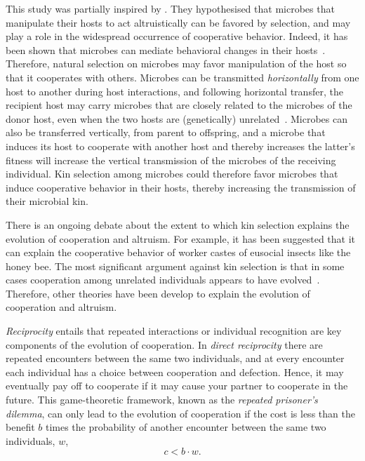 \documentclass[12pt]{extarticle}
\begin{document}
This study was partially inspired by \citet{lewin2017microbes}. 
They hypothesised that microbes that manipulate their hosts to act altruistically can be favored by selection, and may play a role in the widespread occurrence of cooperative behavior. Indeed, it has been shown that microbes can mediate behavioral changes in their hosts~\citep{dobson1988population,poulin2010parasite}. Therefore, natural selection on microbes may favor manipulation of the host so that it cooperates with others. Microbes can be transmitted \emph{horizontally} from one host to another during host interactions, and following horizontal transfer, the recipient host may carry microbes that are closely related to the microbes of the donor host, even when the two hosts are (genetically) unrelated~\citep{lewin2017microbes}. Microbes can also be transferred vertically, from parent to offspring, and %
a microbe that induces its host to cooperate with another host and thereby increases the latter's fitness will  increase the vertical transmission of the microbes of the receiving individual. Kin selection among microbes could therefore favor microbes that induce cooperative behavior in their hosts, thereby increasing the transmission of their microbial kin.




There is an ongoing debate about the extent to which kin selection explains the evolution of cooperation and altruism.
For example, it has been suggested that it can explain the cooperative behavior of worker castes of eusocial insects like the honey bee. %
The most significant argument against kin selection is that in some cases cooperation among unrelated individuals appears to have evolved~\citep{wilson2005kin}.
Therefore, other theories have been develop to explain the evolution of cooperation and altruism.

\emph{Reciprocity} entails that repeated interactions or individual recognition are key components of the evolution of cooperation. In \emph{direct reciprocity} there are repeated encounters between the same two individuals, and at every encounter each individual has a choice between cooperation and defection. Hence, it may eventually pay off to cooperate if it may cause your partner to cooperate in the future.
This game-theoretic framework, known as the \emph{repeated prisoner's dilemma}, 
can only lead to the evolution of cooperation if the cost is less than the benefit $b$ times the probability of another encounter between the same two individuals, $w$, 
\begin{equation} \label{eq:reciprocity}
c < b \cdot w.
\end{equation}
\end{document}
